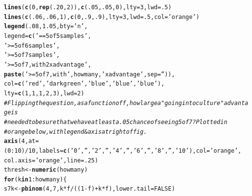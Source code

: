 \documentclass{article}\usepackage[]{graphicx}\usepackage[]{color}
\makeatletter
\newcommand{\hlnum}[1]{\textcolor[rgb]{0.686,0.059,0.569}{#1}}%
\newcommand{\hlstr}[1]{\textcolor[rgb]{0.192,0.494,0.8}{#1}}%
\newcommand{\hlcom}[1]{\textcolor[rgb]{0.678,0.584,0.686}{\textit{#1}}}%
\newcommand{\hlopt}[1]{\textcolor[rgb]{0,0,0}{#1}}%
\newcommand{\hlstd}[1]{\textcolor[rgb]{0.345,0.345,0.345}{#1}}%
\newcommand{\hlkwa}[1]{\textcolor[rgb]{0.161,0.373,0.58}{\textbf{#1}}}%
\newcommand{\hlkwb}[1]{\textcolor[rgb]{0.69,0.353,0.396}{#1}}%
\newcommand{\hlkwc}[1]{\textcolor[rgb]{0.333,0.667,0.333}{#1}}%
\newcommand{\hlkwd}[1]{\textcolor[rgb]{0.737,0.353,0.396}{\textbf{#1}}}%
\newenvironment{kframe}{%
 \def\at@end@of@kframe{}%
 \ifinner\ifhmode%
  \def\at@end@of@kframe{\end{minipage}}%
  \begin{minipage}{\columnwidth}%
 \fi\fi%
 \def\FrameCommand##1{\hskip\@totalleftmargin \hskip-\fboxsep
 \colorbox{shadecolor}{##1}\hskip-\fboxsep
     \hskip-\linewidth \hskip-\@totalleftmargin \hskip\columnwidth}%
 \MakeFramed {\advance\hsize-\width
   \@totalleftmargin\z@ \linewidth\hsize
   \@setminipage}}%
 {\par\unskip\endMakeFramed%
 \at@end@of@kframe}
\newenvironment{knitrout}{}{} %
\makeatother
\begin{document}
\begin{knitrout}
\begin{kframe}
\begin{alltt}
\hlkwd{lines}\hlstd{(}\hlkwd{c}\hlstd{(}\hlnum{0}\hlstd{,}\hlkwd{rep}\hlstd{(}\hlnum{.20}\hlstd{,}\hlnum{2}\hlstd{)),} \hlkwd{c}\hlstd{(}\hlnum{.05}\hlstd{,} \hlnum{.05}\hlstd{,} \hlnum{0}\hlstd{),} \hlkwc{lty}\hlstd{=}\hlnum{3}\hlstd{,} \hlkwc{lwd}\hlstd{=}\hlnum{.5}\hlstd{)}
\hlkwd{lines}\hlstd{(}\hlkwd{c}\hlstd{(}\hlnum{.06}\hlstd{,}\hlnum{.06}\hlstd{,}\hlnum{1}\hlstd{),}\hlkwd{c}\hlstd{(}\hlnum{0}\hlstd{,}\hlnum{.9}\hlstd{,}\hlnum{.9}\hlstd{),}  \hlkwc{lty}\hlstd{=}\hlnum{3}\hlstd{,} \hlkwc{lwd}\hlstd{=}\hlnum{.5}\hlstd{,} \hlkwc{col}\hlstd{=}\hlstr{'orange'}\hlstd{)}
\hlkwd{legend}\hlstd{(}\hlnum{.08}\hlstd{,}\hlnum{1.05}\hlstd{,} \hlkwc{bty}\hlstd{=}\hlstr{'n'}\hlstd{,}
       \hlkwc{legend}\hlstd{=}\hlkwd{c}\hlstd{(}\hlstr{'== 5 of 5 samples'}\hlstd{,}
                \hlstr{'>= 5 of 6 samples'}\hlstd{,}
                \hlstr{'>= 5 of 7 samples'}\hlstd{,}
                \hlstr{'>= 5 of 7, with 2x advantage'}\hlstd{,}
                \hlkwd{paste}\hlstd{(}\hlstr{'>= 5 of 7, with '}\hlstd{,howmany,}\hlstr{'x advantage'}\hlstd{,}\hlkwc{sep}\hlstd{=}\hlstr{''}\hlstd{)),}
       \hlkwc{col}\hlstd{=}\hlkwd{c}\hlstd{(}\hlstr{'red'}\hlstd{,}\hlstr{'darkgreen'}\hlstd{,}\hlstr{'blue'}\hlstd{,}\hlstr{'blue'}\hlstd{,} \hlstr{'blue'}\hlstd{),}
       \hlkwc{lty}\hlstd{=}\hlkwd{c}\hlstd{(}    \hlnum{1}\hlstd{,}          \hlnum{1}\hlstd{,}     \hlnum{1}\hlstd{,}     \hlnum{2}\hlstd{,}      \hlnum{3}\hlstd{),} \hlkwc{lwd}\hlstd{=}\hlnum{2}\hlstd{)}
\hlcom{# Flipping the question, as a function of f, how large a "going into culture" advantage is}
\hlcom{# needed to be sure that we have at least a .05 chance of seeing 5 of 7?  Plotted in}
\hlcom{# orange below, with legend & axis at right of fig.}
\hlkwd{axis}\hlstd{(}\hlnum{4}\hlstd{,} \hlkwc{at}\hlstd{=(}\hlnum{0}\hlopt{:}\hlnum{10}\hlstd{)}\hlopt{/}\hlnum{10}\hlstd{,} \hlkwc{labels}\hlstd{=}\hlkwd{c}\hlstd{(}\hlstr{'0'}\hlstd{,}\hlstr{''}\hlstd{,}\hlstr{'2'}\hlstd{,}\hlstr{''}\hlstd{,}\hlstr{'4'}\hlstd{,}\hlstr{''}\hlstd{,}\hlstr{'6'}\hlstd{,}\hlstr{''}\hlstd{,}\hlstr{'8'}\hlstd{,}\hlstr{''}\hlstd{,}\hlstr{'10'}\hlstd{),} \hlkwc{col}\hlstd{=}\hlstr{'orange'}\hlstd{,}
     \hlkwc{col.axis}\hlstd{=}\hlstr{'orange'}\hlstd{,} \hlkwc{line}\hlstd{=}\hlnum{.25}\hlstd{)}
\hlstd{thresh} \hlkwb{<-} \hlkwd{numeric}\hlstd{(howmany)}
\hlkwa{for}\hlstd{(k} \hlkwa{in} \hlnum{1}\hlopt{:}\hlstd{howmany)\{}
  \hlstd{s7k} \hlkwb{<-} \hlkwd{pbinom}\hlstd{(}\hlnum{4}\hlstd{,} \hlnum{7}\hlstd{, k}\hlopt{*}\hlstd{f}\hlopt{/}\hlstd{((}\hlnum{1}\hlopt{-}\hlstd{f)}\hlopt{+}\hlstd{k}\hlopt{*}\hlstd{f),} \hlkwc{lower.tail}\hlstd{=}\hlnum{FALSE}\hlstd{)}

\end{alltt}
\end{kframe}
\end{knitrout}
\end{document}
